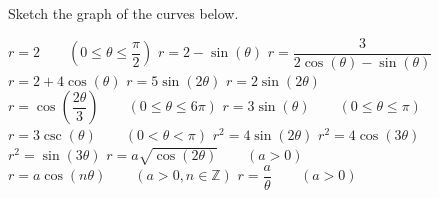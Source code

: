 	
\ifanalysis \pagebreak \fi		
\begin{Exercise}[label = oef_poolkrommes_tekenen] Sketch the graph of the curves below.
    \begin{multicols}{2}
	    \Question[difficulty = 1] $r=2\qquad \left( 0 \leq \theta \leq \dfrac{\pi}{2} \right)$
	    \Question[difficulty = 1] $r = 2 - \sin (\theta)$
		\Question[difficulty = 1] $r = \dfrac{3}{2 \cos (\theta) - \sin (\theta)} $ 
		\Question[difficulty = 1] $r = 2 + 4 \cos(\theta)$ 
		\Question[difficulty = 1] $r = 5\sin(2\theta)$ 
		\Question[difficulty = 1] $r = 2\sin (2\theta)$ 
		\Question[difficulty = 1] $r=\cos \left( \dfrac{2\theta}{3} \right) \qquad \left( 0 \leq \theta \leq 6\pi \right)$ 
		\Question[difficulty = 1] $r=3\sin \left( \theta\right) \qquad \left( 0 \leq \theta \leq \pi \right)$
		\Question[difficulty = 1] $r=3\csc \left( \theta\right) \qquad \left( 0 <\theta < \pi \right)$
		\Question[difficulty = 2] $r^2 = 4 \sin (2\theta)$ 
		\Question[difficulty = 2] $r^2 = 4 \cos (3\theta)$  
		\Question[difficulty = 2] $r^2 = \sin (3\theta)$ 
		\ifanalysis
		\Question[difficulty = 2] $r = a \sqrt{\cos (2 \theta)}\qquad (a > 0)$
		\Question[difficulty = 2] $r = a \cos (n \theta) \qquad (a > 0, n \in \mathbb{Z})$
		\Question[difficulty = 2] $r = \dfrac{a}{\theta}\qquad (a > 0)$
		\fi
	    \EndCurrentQuestion
	\end{multicols}

\end{Exercise}

